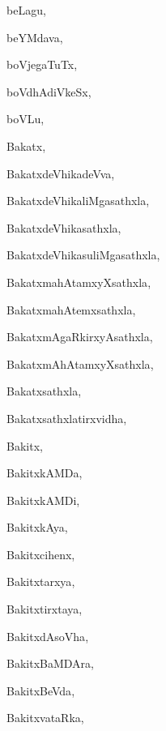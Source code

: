 \begin{multicols}{3}
{\noindent
{beLagu}, \pageref{beLagu}

\noindent
{beYMdava}, \pageref{beYMdava}

\noindent
{boVjegaTuTx}, \pageref{boVjegaTuTx}

\noindent
{boVdhAdiVkeSx}, \pageref{boVdhAdiVkeSx}

\noindent
{boVLu}, \pageref{boVLu}

\bigskip
\noindent
{}
\smallskip

\noindent
{Bakatx}, \pageref{Bakatx}

\noindent
{BakatxdeVhikadeVva}, \pageref{BakatxdeVhikadeVva}

\noindent
{BakatxdeVhikaliMgasathxla}, \pageref{BakatxdeVhikaliMgasathxla}

\noindent
{BakatxdeVhikasathxla}, \pageref{BakatxdeVhikasathxla}

\noindent
{BakatxdeVhikasuliMgasathxla}, \pageref{BakatxdeVhikasuliMgasathxla}

\noindent
{BakatxmahAtamxyXsathxla}, \pageref{BakatxmahAtamxyXsathxla}

\noindent
{BakatxmahAtemxsathxla}, \pageref{BakatxmahAtemxsathxla}

\noindent
{BakatxmAgaRkirxyAsathxla}, \pageref{BakatxmAgaRkirxyAsathxla}

\noindent
{BakatxmAhAtamxyXsathxla}, \pageref{BakatxmAhAtamxyXsathxla}

\noindent
{Bakatxsathxla}, \pageref{Bakatxsathxla}

\noindent
{Bakatxsathxlatirxvidha}, \pageref{Bakatxsathxlatirxvidha}

\noindent
{Bakitx}, \pageref{Bakitx}

\noindent
{BakitxkAMDa}, \pageref{BakitxkAMDa}

\noindent
{BakitxkAMDi}, \pageref{BakitxkAMDi}

\noindent
{BakitxkAya}, \pageref{BakitxkAya}

\noindent
{Bakitxcihenx}, \pageref{Bakitxcihenx}

\noindent
{Bakitxtarxya}, \pageref{Bakitxtarxya}

\noindent
{Bakitxtirxtaya}, \pageref{Bakitxtirxtaya}

\noindent
{BakitxdAsoVha}, \pageref{BakitxdAsoVha}

\noindent
{BakitxBaMDAra}, \pageref{BakitxBaMDAra}

\noindent
{BakitxBeVda}, \pageref{BakitxBeVda}

\noindent
{BakitxvataRka}, \pageref{BakitxvataRka}

}
\end{multicols}
